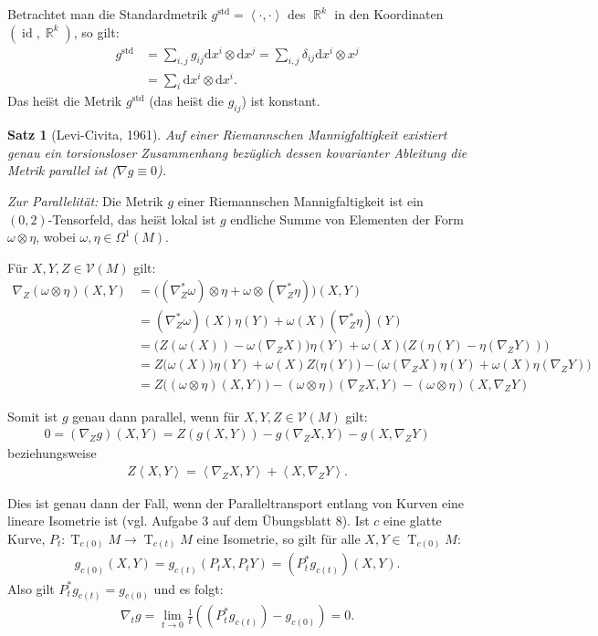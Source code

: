 \documentclass[paper=A4, twoside, chapterprefix=true, bibliography=totoc, headsepline]{scrbook}
\DeclareMathOperator{\R}{\mathbb{R}}
\DeclareMathOperator{\Id}{id}       %
\DeclareMathOperator{\T}{T}         %
\newcommand{\dop}{\mathrm{d}}
\theoremstyle{plain}
\newtheorem{Satz}[Dfn]{Satz}
\theoremstyle{nonumberplain}
\theoremstyle{empty}
\theoremstyle{break}
\begin{document}
Betrachtet man die Standardmetrik $g^{\text{std}} = \left<\cdot,\cdot\right>$ des $\R^k$ in den Koordinaten $(\Id, \R^k)$, so gilt:
\begin{align*}
  g^{\text{std}} & = \sum_{i,j} g_{ij} \dop x^i \otimes \dop x^j = \sum_{i,j} \delta_{ij} \dop x^i \otimes x^j\\
  & = \sum_i \dop x^i \otimes \dop x^i.
\end{align*}
Das hei\"st die Metrik $g^{\text{std}}$ (das hei\"st die $g_{ij}$) ist konstant.

\begin{Satz}[Levi-Civita, 1961] \label{satz-7-12}
  Auf einer Riemannschen Mannigfaltigkeit existiert genau ein torsionsloser Zusammenhang bez\"uglich dessen kovarianter Ableitung die Metrik parallel ist ($\nabla g \equiv 0$).
\end{Satz}

\emph{Zur Parallelit\"at:} Die Metrik $g$ einer Riemannschen Mannigfaltigkeit ist ein $(0,2)$-Tensorfeld, das hei\"st lokal ist $g$ endliche Summe von Elementen der Form $\omega \otimes \eta$, wobei $\omega, \eta \in \Omega^1(M)$.

F\"ur $X,Y,Z \in \mathcal V(M)$ gilt:
\begin{align*}
  \nabla_Z(\omega \otimes \eta)(X,Y) & = \big((\nabla^{*}_Z\omega) \otimes \eta + \omega \otimes (\nabla^{*}_Z \eta)\big)(X,Y)\\
  & = (\nabla^{*}_Z \omega)(X)\eta(Y) + \omega(X)(\nabla^{*}_Z \eta)(Y)\\
  & = \big(Z(\omega(X)) - \omega(\nabla_ZX)\big)\eta(Y) + \omega(X)\big(Z(\eta(Y)-\eta(\nabla_ZY))\big)\\
  & = Z\big(\omega(X)\big)\eta(Y) + \omega(X)Z\big(\eta(Y)\big) - \big(\omega(\nabla_ZX)\eta(Y) + \omega(X)\eta(\nabla_ZY)\big)\\
  & = Z\big((\omega \otimes \eta)(X,Y)\big) - (\omega \otimes \eta)(\nabla_ZX,Y) - (\omega \otimes \eta)(X,\nabla_Z Y)
\end{align*}

Somit ist $g$ genau dann parallel, wenn f\"ur $X,Y,Z \in \mathcal V(M)$ gilt:
\begin{align*}
  0 = (\nabla_Z g)(X,Y) = Z(g(X,Y)) - g(\nabla_ZX,Y) - g(X,\nabla_ZY)
\end{align*}
beziehungsweise
\begin{align*}
  Z\left<X,Y\right> = \left<\nabla_ZX,Y\right> + \left<X,\nabla_ZY\right>.
\end{align*}

Dies ist genau dann der Fall, wenn der Paralleltransport entlang von Kurven eine lineare Isometrie ist (vgl. Aufgabe 3 auf dem \"Ubungsblatt 8).
Ist $c$ eine glatte Kurve, $P_t \colon \T_{c(0)}M \to \T_{c(t)}M$ eine Isometrie, so gilt f\"ur alle $X,Y \in \T_{c(0)}M$: 
\begin{align*}
  g_{c(0)}(X,Y) = g_{c(t)}(P_tX,P_tY) = (P^{*}_tg_{c(t)})(X,Y).
\end{align*}
Also gilt $P_t^{*} g_{c(t)} = g_{c(0)}$ und es folgt:
\begin{align*}
  \nabla_t g = \lim_{t \to 0}\frac{1}{t} \left( (P_t^{*}g_{c(t)}) - g_{c(0)} \right) = 0.
\end{align*}
\end{document}
